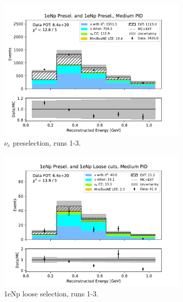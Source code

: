 \begin{figure}[H]
    \centering
    \begin{subfigure}{0.5\linewidth}
        \includegraphics[width=\linewidth]{technote/Sidebands/Figures/NearSideband/near_sideband_reco_e_run123_NP_NP_MEDIUM_PID.pdf}
        \caption{$\nu_e$ preselection, runs 1-3.}
    \end{subfigure}%
    \begin{subfigure}{0.5\linewidth}
        \includegraphics[width=\linewidth]{technote/Sidebands/Figures/NearSideband/near_sideband_reco_e_run123_NP_NPL_MEDIUM_PID.pdf}
        \caption{1eNp loose selection, runs 1-3.}
    \end{subfigure}
    \begin{subfigure}{0.5\linewidth}

\end{subfigure}
\end{figure}
